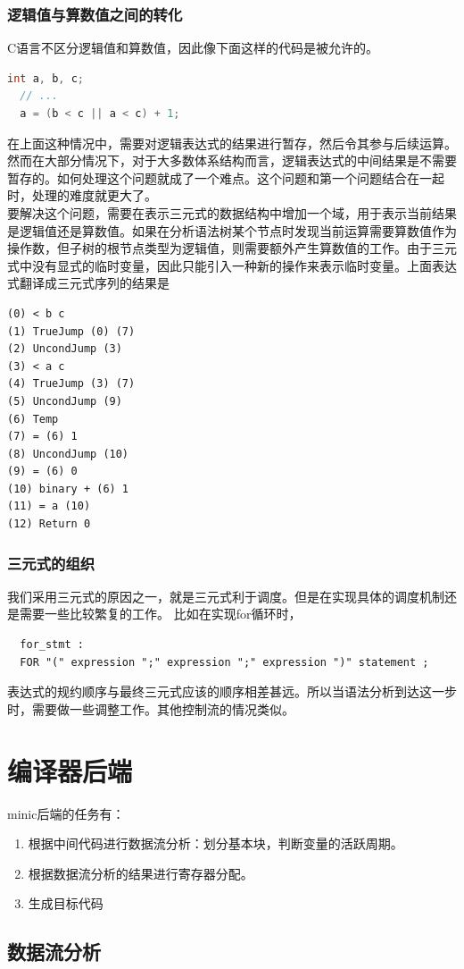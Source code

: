 \documentclass[12pt,a4paper,Flow]{report}
\begin{document}
\subsection{逻辑值与算数值之间的转化}
C语言不区分逻辑值和算数值，因此像下面这样的代码是被允许的。
\begin{lstlisting}[language=c]
  int a, b, c;
  // ...
  a = (b < c || a < c) + 1;
\end{lstlisting}
在上面这种情况中，需要对逻辑表达式的结果进行暂存，然后令其参与后续运算。然而在大部分情况下，对于大多数体系结构而言，逻辑表达式的中间结果是不需要暂存的。如何处理这个问题就成了一个难点。这个问题和第一个问题结合在一起时，处理的难度就更大了。\\
\indent 要解决这个问题，需要在表示三元式的数据结构中增加一个域，用于表示当前结果是逻辑值还是算数值。如果在分析语法树某个节点时发现当前运算需要算数值作为操作数，但子树的根节点类型为逻辑值，则需要额外产生算数值的工作。由于三元式中没有显式的临时变量，因此只能引入一种新的操作来表示临时变量。上面表达式翻译成三元式序列的结果是
\begin{verbatim}
(0) < b c 
(1) TrueJump (0) (7) 
(2) UncondJump (3) 
(3) < a c 
(4) TrueJump (3) (7) 
(5) UncondJump (9) 
(6) Temp 
(7) = (6) 1 
(8) UncondJump (10) 
(9) = (6) 0 
(10) binary + (6) 1 
(11) = a (10) 
(12) Return 0 
\end{verbatim}
\subsection{三元式的组织}
我们采用三元式的原因之一，就是三元式利于调度。但是在实现具体的调度机制还是需要一些比较繁复的工作。
比如在实现for循环时，
\begin{lstlisting}
  for_stmt :
  FOR "(" expression ";" expression ";" expression ")" statement ;
\end{lstlisting}
表达式的规约顺序与最终三元式应该的顺序相差甚远。所以当语法分析到达这一步时，需要做一些调整工作。其他控制流的情况类似。
\chapter{编译器后端}
minic后端的任务有：
\begin{enumerate}
\item 根据中间代码进行数据流分析：划分基本块，判断变量的活跃周期。
\item 根据数据流分析的结果进行寄存器分配。
\item 生成目标代码
\end{enumerate}
\section{数据流分析}
\end{document}
